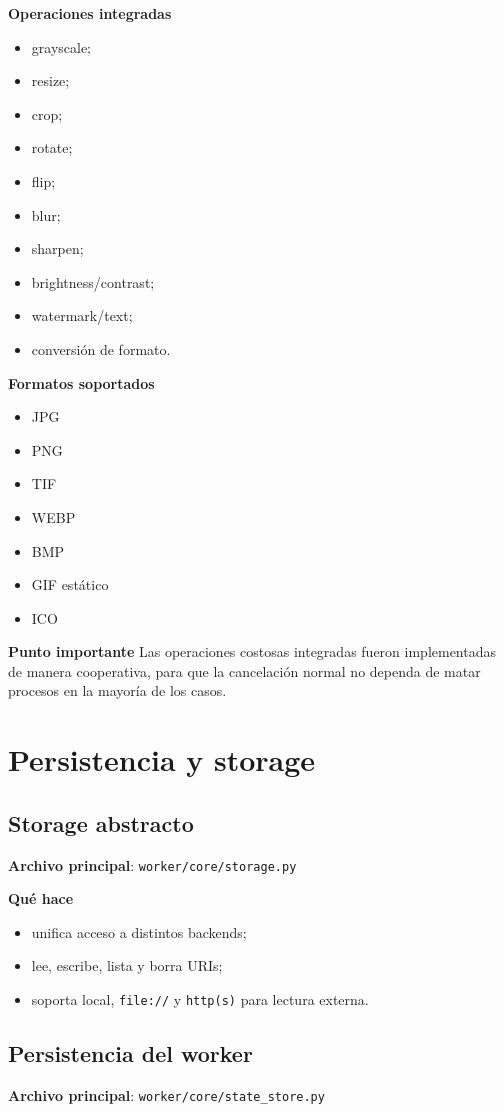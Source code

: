 \documentclass[11pt]{article}
\begin{document}
\textbf{Operaciones integradas}
\begin{itemize}
\item grayscale;
\item resize;
\item crop;
\item rotate;
\item flip;
\item blur;
\item sharpen;
\item brightness/contrast;
\item watermark/text;
\item conversión de formato.
\end{itemize}

\textbf{Formatos soportados}
\begin{itemize}
\item JPG
\item PNG
\item TIF
\item WEBP
\item BMP
\item GIF estático
\item ICO
\end{itemize}

\textbf{Punto importante}
Las operaciones costosas integradas fueron implementadas de manera cooperativa, para que la cancelación normal no dependa de matar procesos en la mayoría de los casos.

\section{Persistencia y storage}

\subsection{Storage abstracto}
\textbf{Archivo principal}: \texttt{worker/core/storage.py}

\textbf{Qué hace}
\begin{itemize}
\item unifica acceso a distintos backends;
\item lee, escribe, lista y borra URIs;
\item soporta local, \texttt{file://} y \texttt{http(s)} para lectura externa.
\end{itemize}

\subsection{Persistencia del worker}
\textbf{Archivo principal}: \texttt{worker/core/state\_store.py}
\end{document}
